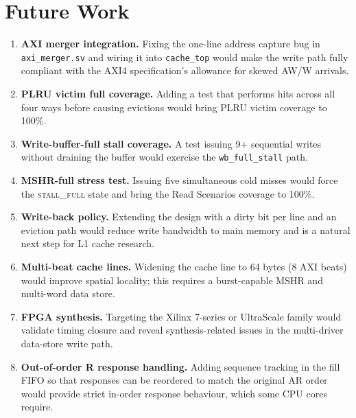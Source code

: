 \documentclass[12pt,letterpaper]{report}
\begin{document}
\section{Future Work}

\begin{enumerate}[label=\arabic*.]
  \item \textbf{AXI merger integration.}  Fixing the one-line address
        capture bug in \texttt{axi\_merger.sv} and wiring it into
        \texttt{cache\_top} would make the write path fully compliant
        with the AXI4 specification's allowance for skewed AW/W
        arrivals.
  \item \textbf{PLRU victim full coverage.}  Adding a test that
        performs hits across all four ways before causing evictions
        would bring PLRU victim coverage to 100\%.
  \item \textbf{Write-buffer-full stall coverage.}  A test issuing
        9+ sequential writes without draining the buffer would
        exercise the \texttt{wb\_full\_stall} path.
  \item \textbf{MSHR-full stress test.}  Issuing five simultaneous
        cold misses would force the \textsc{stall\_full} state and
        bring the Read Scenarios coverage to 100\%.
  \item \textbf{Write-back policy.}  Extending the design with a
        dirty bit per line and an eviction path would reduce write
        bandwidth to main memory and is a natural next step for L1
        cache research.
  \item \textbf{Multi-beat cache lines.}  Widening the cache line to
        64 bytes (8 AXI beats) would improve spatial locality; this
        requires a burst-capable MSHR and multi-word data store.
  \item \textbf{FPGA synthesis.}  Targeting the Xilinx 7-series or
        UltraScale family would validate timing closure and reveal
        synthesis-related issues in the multi-driver data-store write
        path.
  \item \textbf{Out-of-order R response handling.}  Adding sequence
        tracking in the fill FIFO so that responses can be reordered
        to match the original AR order would provide strict in-order
        response behaviour, which some CPU cores require.
\end{enumerate}
\end{document}
